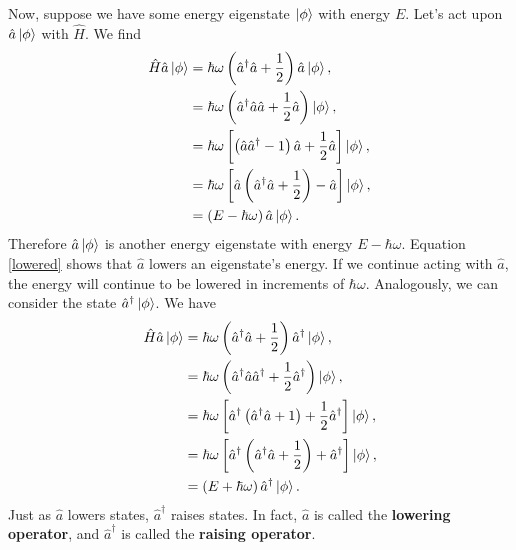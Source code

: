 Now, suppose we have some energy eigenstate $\left| \phi \right\rangle$ with energy $E$. Let's act upon $\hat{a} \left| \phi \right\rangle$ with $\hat{H}$. We find 
\begin{align}
\hat{H} \hat{a}\left| \phi \right\rangle &= \hbar \omega \left(\hat{a}^\dagger\hat{a} + \frac{1}{2} \right) \hat{a}\left| \phi \right\rangle,\nonumber \\
&= \hbar \omega \left(\hat{a}^\dagger\hat{a}\hat{a} + \frac{1}{2}\hat{a} \right) \left| \phi \right\rangle,\nonumber \\
&= \hbar \omega \left[\left(\hat{a}\hat{a}^\dagger -1 \right) \hat{a}+ \frac{1}{2}\hat{a} \right]\left| \phi \right\rangle, \nonumber \\
&= \hbar \omega \left[\hat{a} \left(\hat{a}^\dagger\hat{a} + \frac{1}{2} \right)  - \hat{a} \right] \left| \phi \right\rangle, \nonumber\\
&= \left(E - \hbar \omega \right) \hat{a} \left| \phi \right\rangle.\label{lowered}
\end{align}
Therefore $\hat{a} \left| \phi \right\rangle$ is another energy eigenstate with energy $E-\hbar \omega$. Equation \ref{lowered} shows that $\hat{a}$ lowers an eigenstate's energy. If we continue acting with $\hat{a}$, the energy will continue to be lowered in increments of $\hbar \omega$. 
Analogously, we can consider the state $\hat{a}^\dagger \left| \phi \right\rangle$. We have 
\begin{align}
\hat{H} \hat{a}\left| \phi \right\rangle &= \hbar \omega \left(\hat{a}^\dagger \hat{a}+ \frac{1}{2} \right) \hat{a}^\dagger\left| \phi \right\rangle,\nonumber \\
&= \hbar \omega \left(\hat{a}^\dagger \hat{a}\hat{a}^\dagger + \frac{1}{2}\hat{a}^\dagger \right) \left| \phi \right\rangle,\nonumber \\
&= \hbar \omega \left[\hat{a}^\dagger\left(\hat{a}^\dagger\hat{a} +1 \right) + \frac{1}{2}\hat{a}^\dagger \right]\left| \phi \right\rangle, \nonumber \\
&= \hbar \omega \left[\hat{a}^\dagger \left(\hat{a}^\dagger\hat{a}+ \frac{1}{2} \right)  + \hat{a}^\dagger \right] \left| \phi \right\rangle, \nonumber\\
&= \left(E + \hbar \omega \right) \hat{a}^\dagger \left| \phi \right\rangle.\label{raised}
\end{align}
Just as $\hat{a}$ lowers states, $\hat{a}^\dagger$ raises states. In fact, $\hat{a}$ is called the \textbf{lowering operator}, and $\hat{a}^\dagger$ is called the \textbf{raising operator}.

